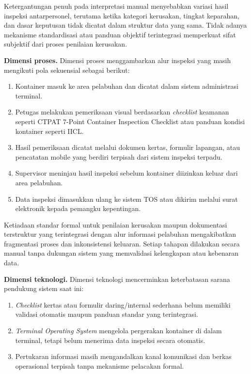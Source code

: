 Ketergantungan penuh pada interpretasi manual menyebabkan variasi hasil
inspeksi antarpersonel, terutama ketika kategori kerusakan, tingkat keparahan,
dan dasar keputusan tidak dicatat dalam struktur data yang sama. Tidak adanya
mekanisme standardisasi atau panduan objektif terintegrasi memperkuat sifat
subjektif dari proses penilaian kerusakan.

\textbf{Dimensi proses.}
Dimensi proses menggambarkan alur inspeksi yang masih mengikuti pola
sekuensial sebagai berikut:
\begin{enumerate}
  \item Kontainer masuk ke area pelabuhan dan dicatat dalam sistem administrasi
  terminal.
  \item Petugas melakukan pemeriksaan visual berdasarkan \textit{checklist}
  keamanan seperti CTPAT 7-Point Container Inspection Checklist atau panduan
  kondisi kontainer seperti IICL.
  \item Hasil pemeriksaan dicatat melalui dokumen kertas, formulir lapangan,
  atau pencatatan mobile yang berdiri terpisah dari sistem inspeksi terpadu.
  \item Supervisor meninjau hasil inspeksi sebelum kontainer diizinkan keluar
  dari area pelabuhan.
  \item Data inspeksi dimasukkan ulang ke sistem TOS atau dikirim melalui surat
  elektronik kepada pemangku kepentingan.
\end{enumerate}

Ketiadaan standar formal untuk penilaian kerusakan maupun dokumentasi terstruktur yang terintegrasi dengan alur informasi pelabuhan mengakibatkan fragmentasi proses dan inkonsistensi keluaran. Setiap tahapan dilakukan secara manual tanpa dukungan sistem yang memvalidasi kelengkapan atau kebenaran data.

\textbf{Dimensi teknologi.}
Dimensi teknologi mencerminkan keterbatasan sarana pendukung sistem saat ini:

\begin{enumerate}
  \item \textit{Checklist} kertas atau formulir daring/internal sederhana belum memiliki
  validasi otomatis maupun panduan standar yang terintegrasi.
  \item \textit{Terminal Operating System} mengelola pergerakan kontainer di
  dalam terminal, tetapi belum menerima data inspeksi secara otomatis.
  \item Pertukaran informasi masih mengandalkan kanal komunikasi dan berkas
  operasional terpisah tanpa mekanisme pelacakan formal.
\end{enumerate}

